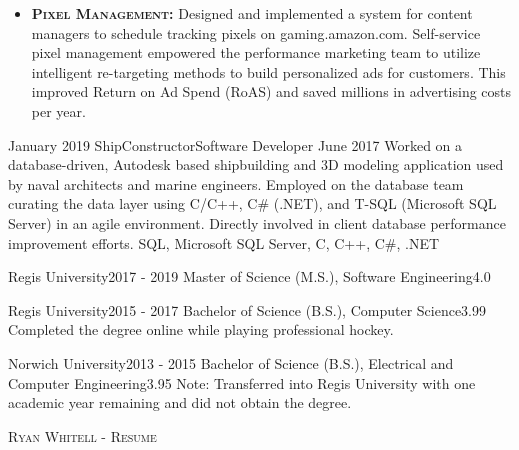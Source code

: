 \documentclass{cv}
\begin{document}
\begin{experiences_env}
{\begin{itemize}
									\item \textbf{\textsc{Pixel Management:}} Designed and implemented a system for content managers to schedule tracking pixels on gaming.amazon.com. Self-service pixel management empowered the performance marketing team to utilize intelligent re-targeting methods to build personalized ads for customers. This improved Return on Ad Spend (RoAS) and saved millions in advertising costs per year.
								\end{itemize}
							}
		\emptySeparator
		\experienceWithoutProjects
			{January 2019}  {ShipConstructor}{Software Developer}
			{June 2017}     {
								Worked on a database-driven, Autodesk based shipbuilding and 3D modeling application used by naval architects and marine engineers. Employed on the database team curating the data layer using C/C++, C\# (.NET), and T-SQL (Microsoft SQL Server) in an agile environment. Directly involved in client database performance improvement efforts.
							}
							{SQL, Microsoft SQL Server, C, C++, C\#, .NET}
		\emptySeparator
	\end{experiences_env}

	\begin{education_env}
		\education
		{Regis University}{2017 - 2019}
		{Master of Science (M.S.), Software Engineering}{4.0}
		{}
					
		\education
		{Regis University}{2015 - 2017}
		{Bachelor of Science (B.S.), Computer Science}{3.99}
		{Completed the degree online while playing professional hockey.}

		\education
		{Norwich University}{2013 - 2015}
		{Bachelor of Science (B.S.), Electrical and Computer Engineering}{3.95}
		{Note: Transferred into Regis University with one academic year remaining and did not obtain the degree.}
	\end{education_env}

	\makecvfooter
	{}
	{\textsc{Ryan Whitell - Resume}}
	{}
\end{document}
